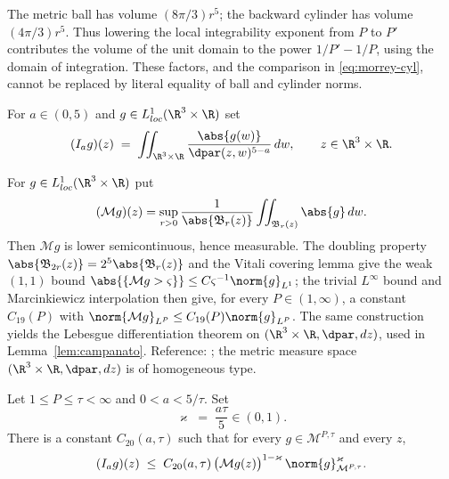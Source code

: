 \documentclass[11pt,reqno]{amsart}
\begin{document}
\begin{remark}
The metric ball has volume $(8\pi/3)r^5$; the backward cylinder has
volume $(4\pi/3)r^5$. Thus lowering the local integrability exponent from
$P$ to $P'$ contributes the volume of the unit domain to the power
$1/P'-1/P$, using the domain of integration. These factors, and the
comparison in \eqref{eq:morrey-cyl}, cannot be replaced by literal equality
of ball and cylinder norms.
\end{remark}

\begin{definition}\label{def:riesz-potential}
For $a\in(0,5)$ and $g\in L^{1}_{loc}(\R^{3}\times\R)$ set
\begin{equation}\label{eq:riesz-potential}
  (I_{a}g)(z)\;=\;\iint_{\R^{3}\times\R}
     \frac{\abs{g(w)}}{\dpar(z,w)^{5-a}}\,dw ,
  \qquad z\in\R^{3}\times\R .
\end{equation}
\end{definition}

\begin{externalinput}\label{ext:maximal}
For $g\in L^{1}_{loc}(\R^{3}\times\R)$ put
\[
  (\mathcal{M}g)(z)=\sup_{r>0}\frac{1}{\abs{\mathfrak{B}_{r}(z)}}
     \iint_{\mathfrak{B}_{r}(z)}\abs{g}\,dw .
\]
Then $\mathcal{M}g$ is lower semicontinuous, hence measurable. The doubling
property $\abs{\mathfrak{B}_{2r}(z)}=2^{5}\abs{\mathfrak{B}_{r}(z)}$ and the
Vitali covering lemma give the weak $(1,1)$ bound
$\abs{\{\mathcal{M}g>\varsigma\}}\le C\varsigma^{-1}\norm{g}_{L^{1}}$; the
trivial $L^{\infty}$ bound and Marcinkiewicz interpolation then give, for every
$P\in(1,\infty)$, a constant $C_{19}(P)$ with
$\norm{\mathcal{M}g}_{L^{P}}\le C_{19}(P)\norm{g}_{L^{P}}$. The same
construction yields the Lebesgue differentiation theorem on
$(\R^{3}\times\R,\dpar,dz)$, used in Lemma~\ref{lem:campanato}.
Reference: \cite[Ch.~I]{Stein1970}; the metric measure space
$(\R^{3}\times\R,\dpar,dz)$ is of homogeneous type.
\end{externalinput}

\begin{lemma}\label{lem:hedberg}
Let $1\le P\le\tau<\infty$ and $0<a<5/\tau$. Set
\begin{equation}\label{eq:hedberg-lambda}
  \varkappa\;=\;\frac{a\tau}{5}\in(0,1).
\end{equation}
There is a constant $C_{20}(a,\tau)$ such that for every
$g\in\mathcal{M}^{P,\tau}$ and every $z$,
\begin{equation}\label{eq:hedberg}
  (I_{a}g)(z)\;\le\;C_{20}(a,\tau)\,
    \bigl(\mathcal{M}g(z)\bigr)^{1-\varkappa}\,
    \norm{g}_{\mathcal{M}^{P,\tau}}^{\varkappa}.
\end{equation}
\end{lemma}
\end{document}
